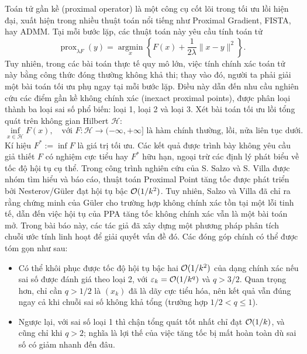 ﻿Toán tử gần kề (proximal operator) là một công cụ cốt lõi trong tối ưu lồi hiện đại, xuất hiện trong nhiều thuật toán nổi tiếng như Proximal Gradient, FISTA, hay ADMM. Tại mỗi bước lặp, các thuật toán này yêu cầu tính toán tử
\[
\operatorname{prox}_{\lambda F}(y) = \operatorname*{argmin}_{x}\left\{ F(x)+\frac{1}{2\lambda}\|x-y\|^2 \right\}.
\]
Tuy nhiên, trong các bài toán thực tế quy mô lớn, việc tính chính xác toán tử này bằng công thức đóng thường không khả thi; thay vào đó, người ta phải giải một bài toán tối ưu phụ ngay tại mỗi bước lặp. 
Điều này dẫn đến nhu cầu nghiên cứu các điểm gần kề không chính xác (inexact proximal points), được phân loại thành ba loại sai số phổ biến: loại 1, loại 2 và loại 3. Xét bài toán tối ưu lồi tổng quát trên không gian Hilbert \(\mathcal{H}\):
\[
\inf_{x\in\mathcal{H}} F(x), \quad \text{với } F: \mathcal{H} \to (-\infty, +\infty] \text{ là hàm chính thường, lồi, nửa liên tục dưới.}
\]
Kí hiệu \(F^* := \inf F\) là giá trị tối ưu. Các kết quả được trình bày không yêu cầu giả thiết \(F\) có nghiệm cực tiểu hay \(F^*\) hữu hạn, ngoại trừ các định lý phát biểu về tốc độ hội tụ cụ thể.
Trong công trình nghiên cứu của S. Salzo và S. Villa \cite{salzovilla2012} được nhóm tìm hiểu và báo cáo, thuật toán Proximal Point tăng tốc được phát triển bởi Nesterov/Güler đạt hội tụ bậc \(\mathcal{O}(1/k^2)\). Tuy nhiên, Salzo và Villa đã chỉ ra rằng chứng minh của Güler cho trường hợp không chính xác tồn tại một lỗi tinh tế, dẫn đến việc hội tụ của PPA tăng tốc không chính xác vẫn là một bài toán mở.
Trong bài báo này, các tác giả đã xây dựng một phương pháp phân tích chuỗi ước tính linh hoạt để giải quyết vấn đề đó. Các đóng góp chính có thể được tóm gọn như sau:
\begin{itemize}
    \item Có thể khôi phục được tốc độ hội tụ bậc hai \(\mathcal{O}(1/k^2)\) của dạng chính xác nếu sai số được đánh giá theo loại 2, với \(\varepsilon_k=\mathcal{O}(1/k^q)\) và \(q>3/2\). Quan trọng hơn, chỉ cần \(q>1/2\) là \((x_k)\) đã là dãy cực tiểu hóa, nên kết quả vẫn đúng ngay cả khi chuỗi sai số không khả tổng (trường hợp \(1/2<q\le1\)).
    \item Ngược lại, với sai số loại 1 thì chận tổng quát tốt nhất chỉ đạt \(\mathcal{O}(1/k)\), và cũng chỉ khi \(q>2\); nghĩa là lợi thế của việc tăng tốc bị mất hoàn toàn dù sai số có giảm nhanh đến đâu.
\end{itemize}